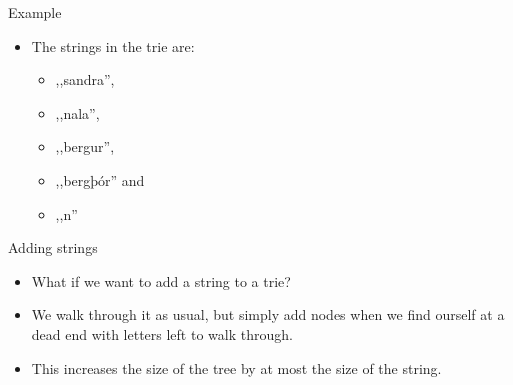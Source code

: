 \documentclass{beamer}
\begin{document}
\begin{frame}[plain]{Example}
	\begin{itemize}
		\item<2-> The strings in the trie are:
		\begin{itemize}
			\item<3-> ,,sandra'',
			\item<4-> ,,nala'',
			\item<5-> ,,bergur'',
			\item<6-> ,,bergþór'' and
			\item<7-> ,,n''
        \end{itemize}
    \end{itemize}
\end{frame}

\begin{frame}[plain]{Adding strings}
    \begin{itemize}
        \item What if we want to add a string to a trie?
        \item We walk through it as usual, but simply add nodes when we find ourself at a dead end with letters left to walk through.
        \item This increases the size of the tree by at most the size of the string.
    \end{itemize}
\end{frame}
\end{document}
